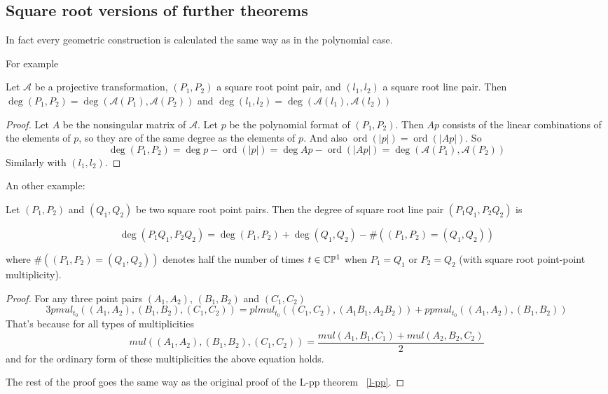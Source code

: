 \documentclass[a4paper]{article}
\newcommand{\ord}{\operatorname{ord}}
\begin{document}
\subsection{Square root versions of further theorems}

In fact every geometric construction is calculated the same way as in the polynomial case.

For example
\begin{theorem}
    Let $\mathcal{A}$ be a projective transformation, $(P_1,P_2)$ a square root point pair, and $(l_1,l_2)$ a square root line pair. Then $\deg (P_1,P_2)=\deg (\mathcal{A}(P_1),\mathcal{A}(P_2))$ and $\deg (l_1,l_2)=\deg (\mathcal{A}(l_1),\mathcal{A}(l_2))$
\end{theorem}
\begin{proof}
    Let $A$ be the nonsingular matrix of $\mathcal{A}$. Let $p$ be the polynomial format of $(P_1,P_2)$. Then $Ap$ consists of the linear combinations of the elements of $p$, so they are of the same degree as the elements of $p$. And also $\ord(|p|)=\ord(|Ap|)$.
    So $$\deg(P_1,P_2)=\deg p-\ord(|p|)=\deg Ap-\ord(|Ap|)=\deg (\mathcal{A}(P_1),\mathcal{A}(P_2))$$
    Similarly with $(l_1,l_2)$.
\end{proof}

An other example:
\begin{theorem}
    Let $(P_1,P_2)$ and $(Q_1,Q_2)$ be two square root point pairs. Then the degree of square root line pair $(P_1Q_1, P_2Q_2)$ is

$$\deg (P_1Q_1, P_2Q_2)= \deg (P_1,P_2) + \deg (Q_1,Q_2) - \# ((P_1,P_2)=(Q_1,Q_2))$$

where $\# ((P_1,P_2)=(Q_1,Q_2))$ denotes half the number of times $t\in \mathbb{C}\mathbb{P}^1$ when $P_1=Q_1$ or $P_2=Q_2$ (with square root point-point multiplicity).\\
\end{theorem}
\begin{proof}
    For any three point pairs $(A_1,A_2)$, $(B_1,B_2)$ and $(C_1,C_2)$
    $$3pmul_{t_0}((A_1,A_2),(B_1,B_2),(C_1,C_2))=plmul_{t_0}((C_1,C_2),(A_1B_1,A_2B_2))+ppmul_{t_0}((A_1,A_2),(B_1,B_2))$$
    That's because for all types of multiplicities $$mul((A_1,A_2),(B_1,B_2),(C_1,C_2))=\frac{mul(A_1,B_1,C_1)+mul(A_2,B_2,C_2)}{2}$$
    and for the ordinary form of these multiplicities the above equation holds.

    The rest of the proof goes the same way as the original proof of the L-pp theorem ~\ref{l-pp}.
\end{proof}
\end{document}
